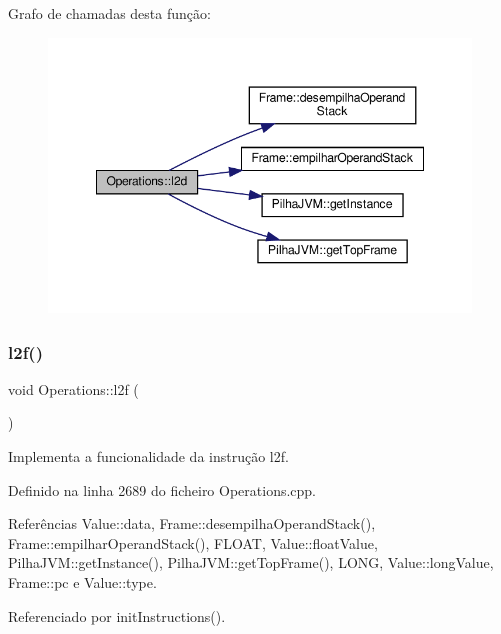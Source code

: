 Grafo de chamadas desta função\+:
\nopagebreak
\begin{figure}[H]
\begin{center}
\leavevmode
\includegraphics[width=348pt]{classOperations_aab1532a2f22ab943a1ec37e33ae742b3_cgraph}
\end{center}
\end{figure}
\mbox{\label{classOperations_af2064cce9ba6f6a4be257354f21f537e}} 
\subsubsection{\texorpdfstring{l2f()}{l2f()}}
{\footnotesize\ttfamily void Operations\+::l2f (\begin{DoxyParamCaption}{ }\end{DoxyParamCaption})\hspace{0.3cm}{\ttfamily [private]}}



Implementa a funcionalidade da instrução l2f. 



Definido na linha 2689 do ficheiro Operations.\+cpp.



Referências Value\+::data, Frame\+::desempilha\+Operand\+Stack(), Frame\+::empilhar\+Operand\+Stack(), F\+L\+O\+AT, Value\+::float\+Value, Pilha\+J\+V\+M\+::get\+Instance(), Pilha\+J\+V\+M\+::get\+Top\+Frame(), L\+O\+NG, Value\+::long\+Value, Frame\+::pc e Value\+::type.



Referenciado por init\+Instructions().

